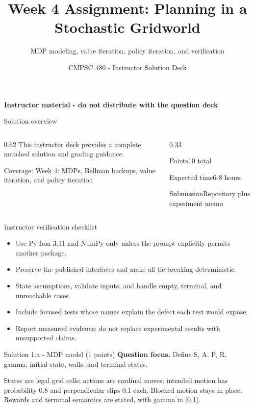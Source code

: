 \documentclass[aspectratio=169,11pt]{beamer}
\title[Week 4 Assignment Solutions]{Week 4 Assignment: Planning in a Stochastic Gridworld}
\subtitle{MDP modeling, value iteration, policy iteration, and verification}
\author{CMPSC 480 - Instructor Solution Deck}
\date{}
\begin{document}
\begin{frame}
  \titlepage
\vspace{-0.35cm}
\begin{center}
\color{coursered}\bfseries Instructor material - do not distribute with the question deck
\end{center}
\end{frame}

\begin{frame}{Solution overview}
\begin{columns}[T,onlytextwidth]
\begin{column}{0.62\textwidth}
\Large This instructor deck provides a complete matched solution and grading guidance.

\vspace{0.35cm}
\normalsize
Coverage: Week 4: MDPs, Bellman backups, value iteration, and policy iteration
\end{column}
\begin{column}{0.33\textwidth}
\begin{block}{Points}10 total\end{block}
\begin{block}{Expected time}6-8 hours\end{block}
\begin{block}{Submission}Repository plus experiment memo\end{block}
\end{column}
\end{columns}
\end{frame}

\begin{frame}{Instructor verification checklist}
\small
\begin{itemize}
  \item Use Python 3.11 and NumPy only unless the prompt explicitly permits another package.
  \item Preserve the published interfaces and make all tie-breaking deterministic.
  \item State assumptions, validate inputs, and handle empty, terminal, and unreachable cases.
  \item Include focused tests whose names explain the defect each test would expose.
  \item Report measured evidence; do not replace experimental results with unsupported claims.
\end{itemize}
\end{frame}

\begin{frame}{Solution 1.a - MDP model (1 points)}
\small
\textbf{Question focus.} Define S, A, P, R, gamma, initial state, walls, and terminal states.

\vspace{0.25cm}
\answerlabel States are legal grid cells; actions are cardinal moves; intended motion has probability 0.8 and perpendicular slips 0.1 each. Blocked motion stays in place. Rewards and terminal semantics are stated, with gamma in [0,1).
\end{frame}
\end{document}
